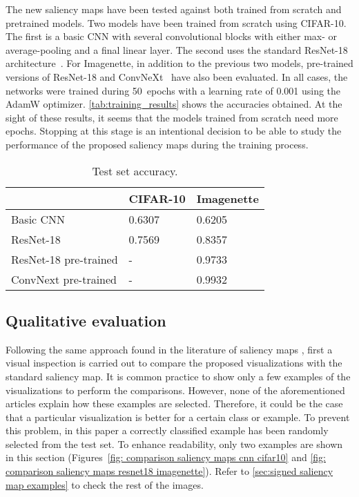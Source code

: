 \documentclass[preprint,12pt]{elsarticle}
\begin{document}
The new saliency maps have been tested against both trained from scratch and pretrained models. Two models have been trained from scratch using CIFAR-10. The first is a basic CNN with several convolutional blocks with either max- or average-pooling and a final linear layer. The second uses the standard ResNet-18 architecture~\cite{heDeepResidualLearning2016}. For Imagenette, in addition to the previous two models, pre-trained versions of ResNet-18 and ConvNeXt~\cite{Liu2022} have also been evaluated. In all cases, the networks were trained during 50~epochs with a learning rate of \num{0.001} using the AdamW optimizer. \autoref{tab:training_results} shows the accuracies obtained. At the sight of these results, it seems that the models trained from scratch need more epochs. Stopping at this stage is an intentional decision to be able to study the performance of the proposed saliency maps during the training process.

\begin{table}[h]
  \centering
  \small
  \caption{Test set accuracy.}
  \label{tab:training_results}
  \begin{tabular}{L{6cm}C{2cm}C{2cm}}
    \toprule
    {} & CIFAR-10 & Imagenette \\
    \midrule
    Basic CNN & 0.6307 & 0.6205 \\
    ResNet-18  & 0.7569 & 0.8357 \\
    ResNet-18 pre-trained  & - & 0.9733 \\
    ConvNext pre-trained & - & 0.9932 \\
    \bottomrule
  \end{tabular}
\end{table}

\subsection{Qualitative evaluation}
Following the same approach found in the literature of saliency maps \cite{Simonyan2014, Springenberg2015, Smilkov2017, Sundarajan2017}, first a visual inspection is carried out to compare the proposed visualizations with the standard saliency map. It is common practice to show only a few examples of the visualizations to perform the comparisons. However, none of the aforementioned articles explain how these examples are selected. Therefore, it could be the case that a particular visualization is better for a certain class or example. To prevent this problem, in this paper a correctly classified example has been randomly selected from the test set. To enhance readability, only two examples are shown in this section (Figures~\ref{fig: comparison saliency maps cnn cifar10} and \ref{fig: comparison saliency maps resnet18 imagenette}). Refer to \ref{sec:signed saliency map examples} to check the rest of the images.
\end{document}
